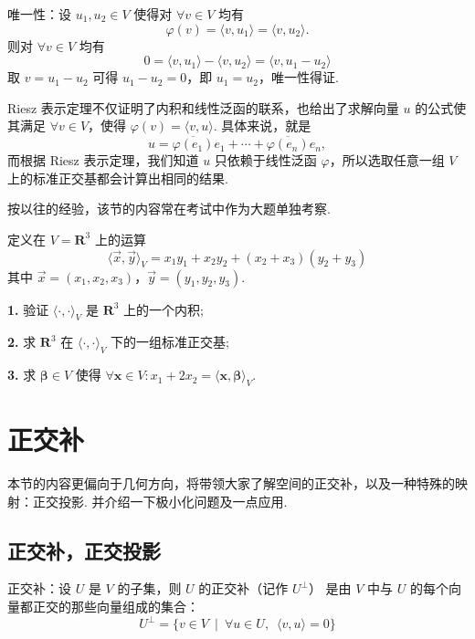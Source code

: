 唯一性：设 $ u_1, u_2 \in V $ 使得对 $\forall v \in V $ 均有
\[\varphi(v) = \langle v, u_1 \rangle = \langle v, u_2 \rangle.\]
则对 $\forall v \in V $ 均有
\[ 0 = \langle v, u_1 \rangle - \langle v, u_2 \rangle = \langle v, u_1 - u_2 \rangle\]
取 $ v = u_1 - u_2 $ 可得 $ u_1 - u_2 = 0 $，即 $ u_1 = u_2 $，唯一性得证. 

Riesz 表示定理不仅证明了内积和线性泛函的联系，也给出了求解向量 $ u $ 的公式使其满足
$ \forall v \in V $，使得 $ \varphi(v) = \langle v, u\rangle $. 具体来说，就是
\[ u = \overline{\varphi(e_1)}e_1 + \cdots + \overline{\varphi(e_n)}e_n, \]
而根据 Riesz 表示定理，我们知道 $ u $ 只依赖于线性泛函 $ \varphi $，所以选取任意一组
$ V $ 上的标准正交基都会计算出相同的结果.  

按以往的经验，该节的内容常在考试中作为大题单独考察. 
\begin{example}
    定义在 $ V = \mathbf{R}^3 $ 上的运算
    \[ \langle \vec{x}, \vec{y} \rangle_V = x_1 y_1 + x_2 y_2 + (x_2 + x_3)(y_2 + y_3) \]
    其中 $ \vec{x} = (x_1, x_2, x_3) $，$ \vec{y} = (y_1, y_2, y_3) $.

    \textbf{1.} 验证 $ \langle \cdot, \cdot \rangle_V $ 是 $ \mathbf{R}^3 $ 上的一个内积;

    \textbf{2.} 求 $ \mathbf{R}^3 $ 在 $ \langle \cdot, \cdot \rangle_V $ 下的一组标准正交基;

    \textbf{3.} 求 $ \boldsymbol{\beta} \in V $ 使得 $ \forall \boldsymbol{x} \in V: x_1 + 2x_2 = \langle \boldsymbol{x}, \boldsymbol{\beta} \rangle_V $.

\end{example}

\section{正交补}

本节的内容更偏向于几何方向，将带领大家了解空间的正交补，以及一种特殊的映射：正交投影. 
并介绍一下极小化问题及一点应用. 

\subsection{正交补，正交投影}

\begin{definition}
    正交补：设 $ U $ 是 $ V $ 的子集，则 $ U $ 的正交补（记作 $ U^{\perp } $）
    是由 $ V $ 中与 $ U $ 的每个向量都正交的那些向量组成的集合：
    \[U^{\perp } = \{ v \in V \enspace | \enspace \forall u \in U, \enspace \langle v, u\rangle = 0\}\]
\end{definition}

